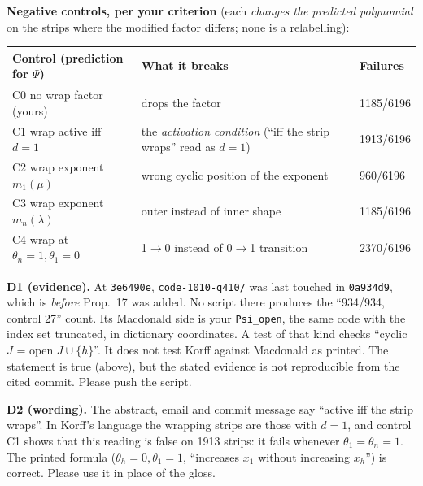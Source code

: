 \documentclass[10pt]{article}
\begin{document}
\textbf{Negative controls, per your criterion} (each \emph{changes the predicted polynomial} on the strips where the
modified factor differs; none is a relabelling):
\begin{center}\small
\begin{tabular}{@{}lll@{}}\toprule
Control (prediction for $\Psi$) & What it breaks & Failures\\\midrule
C0 no wrap factor (yours) & drops the factor & 1185/6196\\
C1 wrap active iff $d=1$ & the \emph{activation condition} (``iff the strip wraps'' read as $d=1$) & 1913/6196\\
C2 wrap exponent $m_1(\mu)$ & wrong cyclic position of the exponent & 960/6196\\
C3 wrap exponent $m_n(\lambda)$ & outer instead of inner shape & 1185/6196\\
C4 wrap at $\theta_n=1,\theta_1=0$ & 1$\to$0 instead of 0$\to$1 transition & 2370/6196\\\bottomrule
\end{tabular}\end{center}

\textbf{D1 (evidence).} At \texttt{3e6490e}, \texttt{code-1010-q410/} was last touched in \texttt{0a934d9}, which is
\emph{before} Prop.~17 was added. No script there produces the ``934/934, control 27'' count. Its Macdonald side is
your \texttt{Psi\_open}, the same code with the index set truncated, in dictionary coordinates. A test of that kind
checks ``cyclic $J$ = open $J\cup\{h\}$''. It does not test Korff against Macdonald as printed. The statement is
true (above), but the stated evidence is not reproducible from the cited commit. Please push the script.

\textbf{D2 (wording).} The abstract, email and commit message say ``active iff the strip wraps''. In Korff's
language the wrapping strips are those with $d=1$, and control C1 shows that this reading is false on 1913 strips:
it fails whenever $\theta_1=\theta_n=1$. The printed formula ($\theta_h=0,\theta_1=1$, ``increases $x_1$ without
increasing $x_h$'') is correct. Please use it in place of the gloss.
\end{document}
